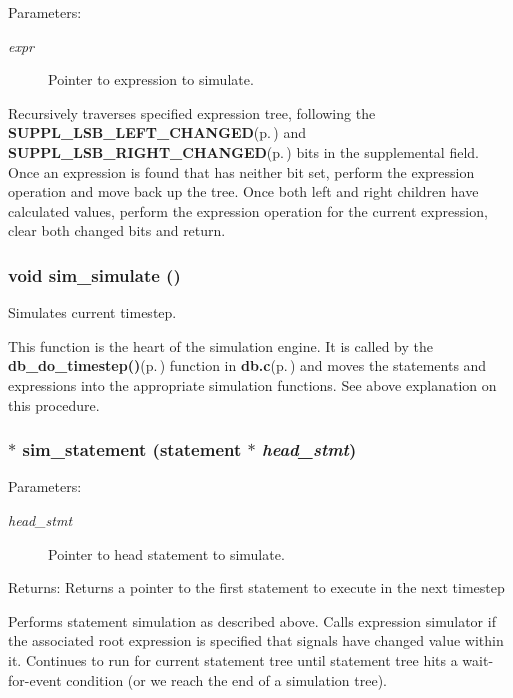 \begin{Desc}
\item[Parameters:]
\begin{description}
\item[{\em expr}]Pointer to expression to simulate.\end{description}
\end{Desc}
Recursively traverses specified expression tree, following the {\bf SUPPL\_\-LSB\_\-LEFT\_\-CHANGED}{\rm (p.\,\pageref{group__expr__suppl_a9})} and {\bf SUPPL\_\-LSB\_\-RIGHT\_\-CHANGED}{\rm (p.\,\pageref{group__expr__suppl_a10})} bits in the supplemental field. Once an expression is found that has neither bit set, perform the expression operation and move back up the tree. Once both left and right children have calculated values, perform the expression operation for the current expression, clear both changed bits and return. 
\subsubsection{\setlength{\rightskip}{0pt plus 5cm}void sim\_\-simulate ()}\label{sim_8c_a10}


Simulates current timestep. 

This function is the heart of the simulation engine. It is called by the {\bf db\_\-do\_\-timestep()}{\rm (p.\,\pageref{db_8c_a45})} function in {\bf db.c}{\rm (p.\,\pageref{db_8c})} and moves the statements and expressions into the appropriate simulation functions. See above explanation on this procedure. 
\subsubsection{$\ast$ sim\_\-statement ({\bf statement} $\ast$ {\em head\_\-stmt})}\label{sim_8c_a9}


\begin{Desc}
\item[Parameters:]
\begin{description}
\item[{\em head\_\-stmt}]Pointer to head statement to simulate.\end{description}
\end{Desc}
\begin{Desc}
\item[Returns:]Returns a pointer to the first statement to execute in the next timestep\end{Desc}
Performs statement simulation as described above. Calls expression simulator if the associated root expression is specified that signals have changed value within it. Continues to run for current statement tree until statement tree hits a wait-for-event condition (or we reach the end of a simulation tree). 

